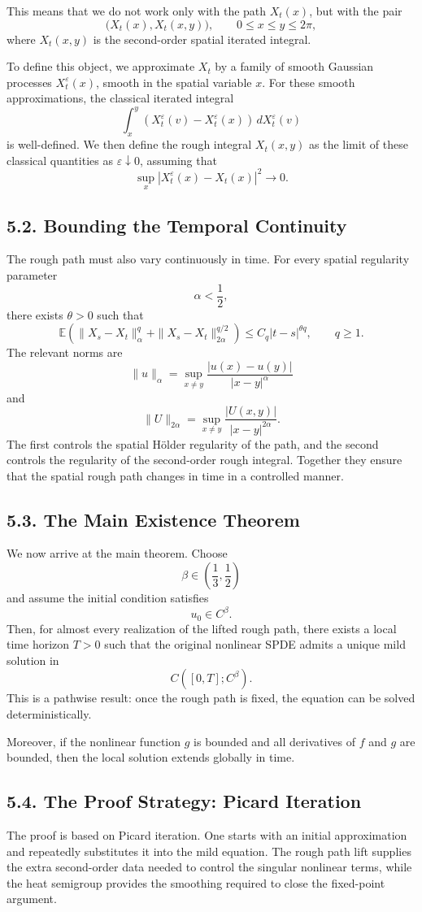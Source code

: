 \documentclass[11pt]{article}
\theoremstyle{definition}
\theoremstyle{remark}
\begin{document}
This means that we do not work only with the path \(X_t(x)\), but with the pair
\[
\bigl(X_t(x),X_t(x,y)\bigr),
\qquad 0\le x\le y\le 2\pi,
\]
where \(X_t(x,y)\) is the second-order spatial iterated integral.

To define this object, we approximate \(X_t\) by a family of smooth Gaussian processes \(X_t^\varepsilon(x)\), smooth in the spatial variable \(x\). For these smooth approximations, the classical iterated integral
\[
\int_x^y (X_t^\varepsilon(v)-X_t^\varepsilon(x))\,dX_t^\varepsilon(v)
\]
is well-defined. We then define the rough integral \(X_t(x,y)\) as the limit of these classical quantities as \(\varepsilon\downarrow 0\), assuming that
\[
\sup_x |X_t^\varepsilon(x)-X_t(x)|^2\to 0.
\]

\subsection*{5.2. Bounding the Temporal Continuity}
The rough path must also vary continuously in time. For every spatial regularity parameter
\[
\alpha<\frac12,
\]
there exists \(\theta>0\) such that
\[
\mathbb E\left(
\|X_s-X_t\|_\alpha^q
+
\|X_s-X_t\|_{2\alpha}^{q/2}
\right)
\le
C_q |t-s|^{\theta q},
\qquad q\ge 1.
\]
The relevant norms are
\[
\|u\|_\alpha
=
\sup_{x\ne y}\frac{|u(x)-u(y)|}{|x-y|^\alpha}
\]
and
\[
\|U\|_{2\alpha}
=
\sup_{x\ne y}\frac{|U(x,y)|}{|x-y|^{2\alpha}}.
\]
The first controls the spatial Hölder regularity of the path, and the second controls the regularity of the second-order rough integral. Together they ensure that the spatial rough path changes in time in a controlled manner.

\subsection*{5.3. The Main Existence Theorem}
We now arrive at the main theorem. Choose
\[
\beta\in\left(\frac13,\frac12\right)
\]
and assume the initial condition satisfies
\[
u_0\in C^\beta.
\]
Then, for almost every realization of the lifted rough path, there exists a local time horizon \(T>0\) such that the original nonlinear SPDE admits a unique mild solution in
\[
C([0,T];C^\beta).
\]
This is a pathwise result: once the rough path is fixed, the equation can be solved deterministically.

Moreover, if the nonlinear function \(g\) is bounded and all derivatives of \(f\) and \(g\) are bounded, then the local solution extends globally in time.

\subsection*{5.4. The Proof Strategy: Picard Iteration}
The proof is based on Picard iteration. One starts with an initial approximation and repeatedly substitutes it into the mild equation. The rough path lift supplies the extra second-order data needed to control the singular nonlinear terms, while the heat semigroup provides the smoothing required to close the fixed-point argument.
\end{document}
